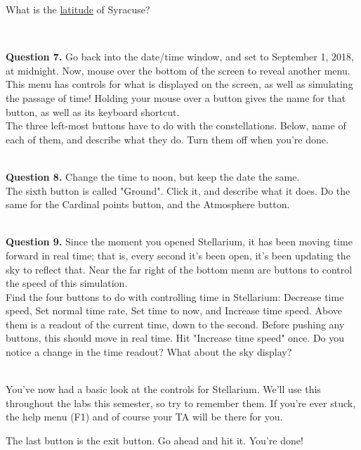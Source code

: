 \documentclass[11pt]{article}
\begin{document}
What is the \underline{latitude} of Syracuse?\\
\vspace*{1.5cm}

\hrulefill\\

\newpage

\textbf{Question 7.} Go back into the date/time window, and set to September 1, 2018, at midnight. Now, mouse over the bottom of the screen to reveal another menu. This menu has controls for what is displayed on the screen, as well as simulating the passage of time! Holding your mouse over a button gives the name for that button, as well as its keyboard shortcut.\\

The three left-most buttons have to do with the constellations. Below, name of each of them, and describe what they do. Turn them off when you're done. \\
\vspace*{1.5cm}

\hrulefill\\   

\textbf{Question 8.} Change the time to noon, but keep the date the same.\\

The sixth button is called "Ground". Click it, and describe what it does. Do the same for the Cardinal points button, and the Atmosphere button.
\vspace*{1.5cm}

\hrulefill\\ 

\textbf{Question 9.} Since the moment you opened Stellarium, it has been moving time forward in real time; that is, every second it's been open, it's been updating the sky to reflect that. Near the far right of the bottom menu are buttons to control the speed of this simulation. \\

Find the four buttons to do with controlling time in Stellarium: Decrease time speed, Set normal time rate, Set time to now, and Increase time speed. Above them is a readout of the current time, down to the second. Before pushing any buttons, this should move in real time. Hit "Increase time speed" once. Do you notice a change in the time readout? What about the sky display?
\vspace*{1.5cm}

\hrulefill\\

You've now had a basic look at the controls for Stellarium. We'll use this throughout the labs this semester, so try to remember them. If you're ever stuck, the help menu (F1) and of course your TA will be there for you.

The last button is the exit button. Go ahead and hit it. You're done!
\end{document}
